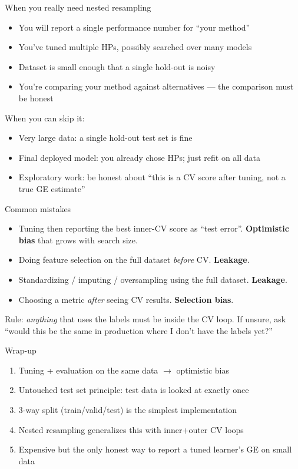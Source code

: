 \documentclass[aspectratio=169]{beamer}
\begin{document}
\begin{frame}{When you really need nested resampling}
  \begin{itemize}
    \item You will report a single performance number for ``your method''
    \item You've tuned multiple HPs, possibly searched over many models
    \item Dataset is small enough that a single hold-out is noisy
    \item You're comparing your method against alternatives — the comparison must be honest
  \end{itemize}
  \vfill
  When you can skip it:
  \begin{itemize}
    \item Very large data: a single hold-out test set is fine
    \item Final deployed model: you already chose HPs; just refit on all data
    \item Exploratory work: be honest about ``this is a CV score after tuning, not a true GE estimate''
  \end{itemize}
\end{frame}

\begin{frame}{Common mistakes}
  \begin{itemize}
    \item Tuning then reporting the best inner-CV score as ``test error''. \textbf{Optimistic bias} that grows with search size.
    \item Doing feature selection on the full dataset \emph{before} CV. \textbf{Leakage}.
    \item Standardizing / imputing / oversampling using the full dataset. \textbf{Leakage}.
    \item Choosing a metric \emph{after} seeing CV results. \textbf{Selection bias}.
  \end{itemize}
  \vfill
  Rule: \emph{anything} that uses the labels must be inside the CV loop. If unsure, ask ``would this be the same in production where I don't have the labels yet?''
\end{frame}

\begin{frame}{Wrap-up}
  \begin{enumerate}
    \item Tuning + evaluation on the same data $\to$ optimistic bias
    \item Untouched test set principle: test data is looked at exactly once
    \item 3-way split (train/valid/test) is the simplest implementation
    \item Nested resampling generalizes this with inner+outer CV loops
    \item Expensive but the only honest way to report a tuned learner's GE on small data
  \end{enumerate}
\end{frame}
\end{document}
